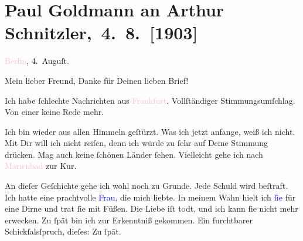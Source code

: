 

\renewcommand{\erwaehntePersonen}{Personen: Theodore Rottenberg, Olga Schnitzler}
\renewcommand{\erwaehnteOrte}{Orte: Berlin, Frankfurt am Main, Marienbad, Wien}
\renewcommand{\erwaehnteWerke}{}
\section[ Paul Goldmann an Arthur Schnitzler, 4. 8. {[}1903{]}]{Paul Goldmann an Arthur Schnitzler, 4. 8. {[}1903{]}}
\nopagebreak{}
\rehead{ }\normalsize\beginnumbering{}
\toendnotes[C]{\smallbreak\pagebreak[2]}
\toendnotes[C]{\smallbreak}
\pstart
           \centering{}{\pb}\textcolor{pink}{Berlin}{}\ledrightnote{\textcolor{pink}{Berlin}}, 4. Auguſt.\pend
           
\pstart{}Mein lieber Freund,\pend
\pstart
           Danke für Deinen lieben Brief!\pend
           
\pstart
           Ich habe ſchlechte Nachrichten aus \textcolor{pink}{Frankfurt}{}\ledrightnote{\textcolor{pink}{Frankfurt am Main}}.
               Vollſtändiger Stimmungsumſchlag. Von einer \label{K_L03380-1v}\label{K_L03380-1h} keine Rede mehr.\pend
           
\pstart
           Ich bin wieder aus allen Himmeln geſtürzt. Was ich jetzt anfange, weiß ich nicht. Mit
               Dir will ich nicht reiſen, denn ich würde zu ſehr auf Deine Stimmung drücken. Mag
               auch keine ſchönen Länder ſehen. Vielleicht gehe ich nach \textcolor{pink}{Marienbad}{}\ledrightnote{\textcolor{pink}{Marienbad}} zur Kur.\pend
           
\pstart
           An dieſer Geſchichte gehe ich wohl noch zu Grunde. Jede Schuld wird beſtraft. Ich
               hatte eine prachtvolle \textcolor{blue}{Frau}{}\ledrightnote{{$\rightarrow$}\textcolor{blue}{Theodore Rottenberg}},
               die {\pb}mich liebte. In meinem Wahn hielt ich \textcolor{blue}{ſie}{}\ledrightnote{\textcolor{blue}{Theodore Rottenberg}} für eine Dirne und trat ſie mit Füßen. Die
               Liebe iſt todt, und ich kann ſie nicht mehr erwecken. Zu ſpät bin ich zur Erkenntniß
               gekommen. Ein furchtbarer Schickſalsſpruch, dieſes: Zu ſpät.\pend
           
